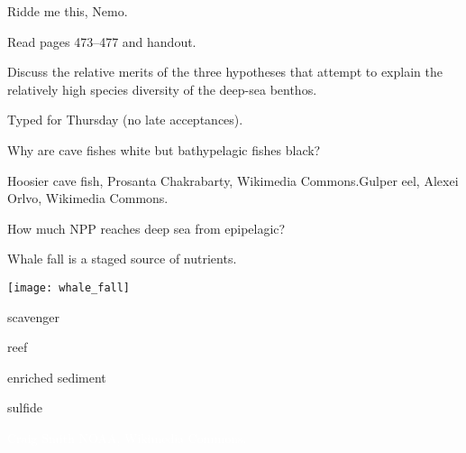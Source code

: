 \documentclass[t]{beamer}
\begin{document}

\begin{frame}[t]{Ridde me this, Nemo.}

	\hangpara Read pages 473--477 and handout.

	\hangpara Discuss the relative merits of the three hypotheses that attempt to explain the relatively high species diversity of the deep-sea benthos.

	\hangpara Typed for Thursday (no late acceptances).
	
\end{frame}

{
\begin{frame}[b]{Why are cave fishes white but bathypelagic fishes black?}

\tiny Hoosier cave fish, Prosanta Chakrabarty, Wikimedia Commons.\hfill Gulper eel, Alexei Orlvo, Wikimedia Commons.
\end{frame}}

{
\begin{frame}[t]{How much NPP reaches deep sea from epipelagic?}
\end{frame}}

\begin{frame}[t]{Whale fall is a staged source of nutrients.}

\vspace*{-\baselineskip}

	\begin{multicols}{2}
		{\centering
		\texttt{[image: whale\_fall]}\par}

	\columnbreak

		\hangpara scavenger

		\hangpara reef

		\hangpara enriched sediment

		\hangpara sulfide

	\end{multicols}


\end{frame}

{
\begin{frame}[b]

\tiny\hfill\textcolor{white}{Craig Smith NOAA, Wikimedia Commons.}
\end{frame}}
\end{document}
